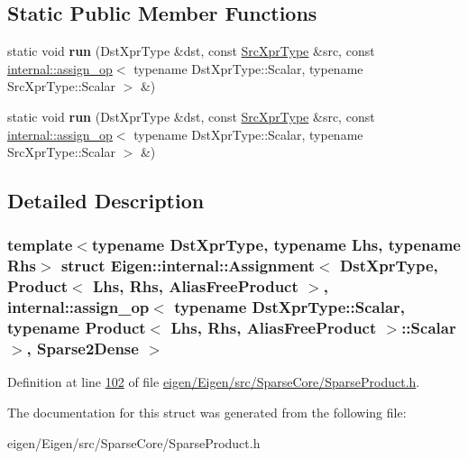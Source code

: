 \subsection*{Static Public Member Functions}
\begin{DoxyCompactItemize}
\item 
\mbox{\label{struct_eigen_1_1internal_1_1_assignment_3_01_dst_xpr_type_00_01_product_3_01_lhs_00_01_rhs_00_01c841c32521f12d3d43fe6d566cc4cbd8_a969d643c0bc0547dda3f2a9d1dbc4285}} 
static void {\bfseries run} (Dst\+Xpr\+Type \&dst, const \hyperlink{group___core___module_class_eigen_1_1_product}{Src\+Xpr\+Type} \&src, const \hyperlink{struct_eigen_1_1internal_1_1assign__op}{internal\+::assign\+\_\+op}$<$ typename Dst\+Xpr\+Type\+::\+Scalar, typename Src\+Xpr\+Type\+::\+Scalar $>$ \&)
\item 
\mbox{\label{struct_eigen_1_1internal_1_1_assignment_3_01_dst_xpr_type_00_01_product_3_01_lhs_00_01_rhs_00_01c841c32521f12d3d43fe6d566cc4cbd8_a969d643c0bc0547dda3f2a9d1dbc4285}} 
static void {\bfseries run} (Dst\+Xpr\+Type \&dst, const \hyperlink{group___core___module_class_eigen_1_1_product}{Src\+Xpr\+Type} \&src, const \hyperlink{struct_eigen_1_1internal_1_1assign__op}{internal\+::assign\+\_\+op}$<$ typename Dst\+Xpr\+Type\+::\+Scalar, typename Src\+Xpr\+Type\+::\+Scalar $>$ \&)
\end{DoxyCompactItemize}


\subsection{Detailed Description}
\subsubsection*{template$<$typename Dst\+Xpr\+Type, typename Lhs, typename Rhs$>$\newline
struct Eigen\+::internal\+::\+Assignment$<$ Dst\+Xpr\+Type, Product$<$ Lhs, Rhs, Alias\+Free\+Product $>$, internal\+::assign\+\_\+op$<$ typename Dst\+Xpr\+Type\+::\+Scalar, typename Product$<$ Lhs, Rhs, Alias\+Free\+Product $>$\+::\+Scalar $>$, Sparse2\+Dense $>$}



Definition at line \hyperlink{eigen_2_eigen_2src_2_sparse_core_2_sparse_product_8h_source_l00102}{102} of file \hyperlink{eigen_2_eigen_2src_2_sparse_core_2_sparse_product_8h_source}{eigen/\+Eigen/src/\+Sparse\+Core/\+Sparse\+Product.\+h}.



The documentation for this struct was generated from the following file\+:\begin{DoxyCompactItemize}
\item 
eigen/\+Eigen/src/\+Sparse\+Core/\+Sparse\+Product.\+h\end{DoxyCompactItemize}
